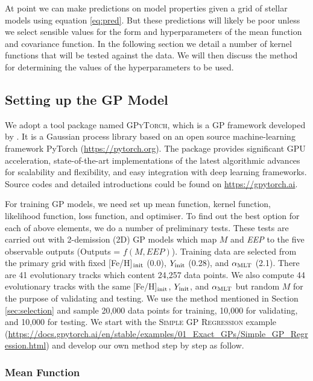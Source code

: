 At point we can make predictions on model properties given a grid of stellar models using equation \ref{eq:pred}.  But these predictions will likely be poor unless we select sensible values for the form and hyperparameters of the mean function and covariance function.  In the following section we detail a number of kernel functions that will be tested against the data.  We will then discuss the method for determining the values of the hyperparameters to be used.


\subsection{Setting up the GP Model}\label{sec:set_up}

We adopt a tool package named \textsc{GPyTorch}, which is a GP framework developed by \citet{gardner2018gpytorch}. It is a Gaussian process library based on an open source machine-learning framework PyTorch (\url{https://pytorch.org}). The package provides significant GPU acceleration, state-of-the-art implementations of the latest algorithmic advances for scalability and flexibility, and easy integration with deep learning frameworks. Source codes and detailed introductions could be found on \url{https://gpytorch.ai}.

For training GP models, we need set up mean function, kernel function, likelihood function, loss function, and optimiser. 
To find out the best option for each of above elements, we do a number of preliminary tests. 
These tests are carried out with 2-demission (2D) GP models which map $M$ and {\it EEP} to the five observable outputs (Outputs = $f(M, EEP)$). Training data are selected from the primary grid with fixed [Fe/H]$_{\rm init}$ (0.0), $Y_{\rm init}$ (0.28), and $\alpha_{\rm MLT}$ (2.1). There are 41 evolutionary tracks which content 24,257 data points. We also compute 44 evolutionary tracks with the same [Fe/H]$_{\rm init}$, $Y_{\rm init}$, and $\alpha_{\rm MLT}$ but random $M$ for the purpose of validating and testing. We use the method mentioned in Section \ref{sec:selection} and sample 20,000 data points for training, 10,000 for validating, and 10,000 for testing. 
%
We start with the \textsc{Simple GP Regression} example (\url{https://docs.gpytorch.ai/en/stable/examples/01_Exact_GPs/Simple_GP_Regression.html}) and develop our own method step by step as follow. 

\subsubsection{Mean Function}

